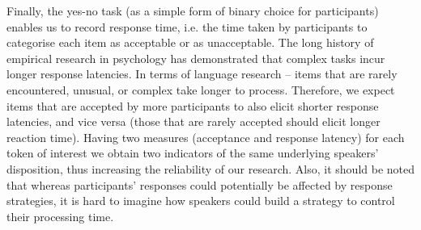 Finally, the yes-no task (as a simple form of binary choice for participants) enables us to record response time, i.e. the time taken by participants to categorise each item as acceptable or as unacceptable. The long history of empirical research in psychology has demonstrated that complex tasks incur longer response latencies. In terms of language research – items that are rarely encountered, unusual, or complex take longer to process. Therefore, we expect items that are accepted by more participants to also elicit shorter response latencies, and vice versa (those that are rarely accepted should elicit longer reaction time). Having two measures (acceptance and response latency) for each token of interest we obtain two indicators of the same underlying speakers’ disposition, thus increasing the reliability of our research. Also, it should be noted that whereas participants’ responses could potentially be affected by response strategies, it is hard to imagine how speakers could build a strategy to control their processing time. 
